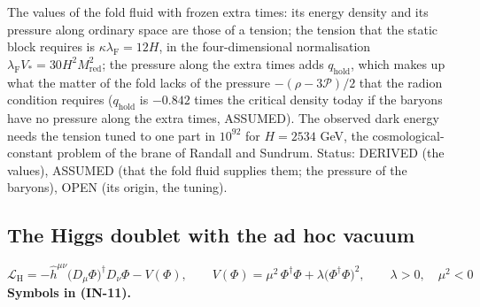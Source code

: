 \documentclass[
  10pt,
]{article}
\begin{document}
The values of the fold fluid with frozen extra times: its energy density
and its pressure along ordinary space are those of a tension; the
tension that the static block requires is
\(\kappa\lambda_{\mathrm{F}} = 12H\), in the four-dimensional
normalisation \(\lambda_{\mathrm{F}}V_* = 30H^2M_{\mathrm{red}}^2\); the
pressure along the extra times adds \(q_{\mathrm{hold}}\), which makes
up what the matter of the fold lacks of the pressure
\(-(\rho - 3\mathcal{P})/2\) that the radion condition requires
(\(q_{\mathrm{hold}}\) is \(-0.842\) times the critical density today if
the baryons have no pressure along the extra times, ASSUMED). The
observed dark energy needs the tension tuned to one part in \(10^{92}\)
for \(H = 2534\) GeV, the cosmological-constant problem of the brane of
Randall and Sundrum. Status: DERIVED (the values), ASSUMED (that the
fold fluid supplies them; the pressure of the baryons), OPEN (its
origin, the tuning).

\hypertarget{the-higgs-doublet-with-the-ad-hoc-vacuum}{%
\subsection{The Higgs doublet with the ad hoc
vacuum}\label{the-higgs-doublet-with-the-ad-hoc-vacuum}}

\[
\mathcal{L}_{\mathrm{H}} = -\hat h^{\mu\nu}\big(D_\mu\Phi\big)^\dagger D_\nu\Phi - V(\Phi),\qquad
V(\Phi) = \mu^2\,\Phi^\dagger\Phi + \lambda\big(\Phi^\dagger\Phi\big)^2,\qquad \lambda > 0,\quad \mu^2 < 0 \tag{IN-11}
\] \textbf{Symbols in (IN-11).}
\end{document}
